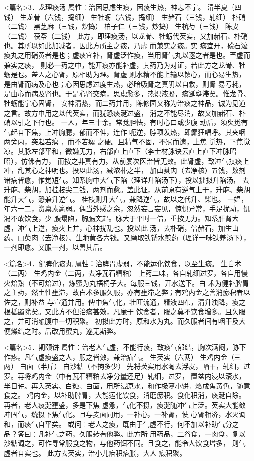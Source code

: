 \documentclass[a4paper,12pt,UTF8,twoside]{ctexbook}
\begin{document}
<篇名>3．龙理痰汤
属性：治因思虑生痰，因痰生热，神志不宁。 
清半夏（四钱） 生龙骨（六钱，捣细） 生牡蛎（六钱，捣细） 生赭石（三钱，轧细） 朴硝（二钱） 
黑芝麻（三钱，炒捣） 柏子仁（三钱，炒捣） 生杭芍（三钱） 陈皮（二钱） 茯苓（二钱） 
此方，即理痰汤，以龙骨、牡蛎代芡实，又加赭石、朴硝也。其所以如此加减者，因此方所主之痰，乃虚 
而兼实之痰。实 
痰宜开，礞石滚痰丸之用硝黄者是也；虚痰宜补，肾虚泛作痰，当用肾气丸以逐之者是也。至虚而兼实之痰， 
则必一药之中，能开痰亦能补虚，其药乃为对证，若此方之龙骨、牡蛎是也。盖人之心肾，原相助为理。肾虚 
则水精不能上输以镇心，而心易生热，是由肾而病及心也；心因思虑过度生热，必暗吸肾之真阴以自救，则肾 
易亏耗，是由心而病及肾也。于是心肾交病，思虑愈多，热炽液凝，痰涎壅滞矣。惟龙骨、牡蛎能宁心固肾， 
安神清热，而二药并用，陈修园又称为治痰之神品，诚为见道之言。故方中用之以代芡实，而犹恐痰涎过盛， 
消之不能尽消，故又加赭石、朴硝以引之下行也。 
一人，年三十余。常觉胆怯，有时心口或少腹 动后，须臾觉有气起自下焦，上冲胸臆，郁而不伸，连作 
呃逆，脖项发热，即癫狂唱呼。其夹咽两旁内，突起若瘰 ，而不若瘰 之硬。且精气不固，不寐而遗，上焦 
觉热，下焦觉凉。其脉左部平和，微嫌无力，右部直上直下（李士材脉诀云直上直下冲脉昭昭），仿佛有力， 
而按之非真有力。从前屡次医治皆无效。此肾虚，致冲气挟痰上冲，乱其心之神明也。投以此汤，减浓朴之半， 
加山萸肉（去净核）五钱，数剂诸病皆愈，惟觉短气。知系胸中大气下陷（理详升陷汤下），投以拙拟升陷汤， 
去升麻、柴胡，加桂枝尖二钱，两剂而愈。盖此证，从前原有逆气上干，升麻、柴胡能升大气，恐兼升逆气。 
桂枝则升大气，兼降逆气，故以之代升、柴也。 
一媪，年六十二，资禀素羸弱。偶当外感之余，忽然妄言妄见，惊惧异常，手足扰动，饥渴不敢饮食，少 
腹塌陷，胸膈突起。脉大于平时一倍，重按无力。知系肝肾大虚，冲气上逆，痰火上并，心神扰乱也。投以此 
汤，去朴硝，倍赭石，加生山药、山萸肉（去净核）、生地黄各六钱。又磨取铁锈水煎药（理详一味铁养汤下）， 
一剂即愈。又服一剂，以善其后。 


<篇名>4．健脾化痰丸
属性：治脾胃虚弱，不能运化饮食，以至生痰。 
生白术（二两） 生鸡内金（二两，去净瓦石糟粕） 
上药二味，各自轧细过罗，各自用慢火焙熟（不可焙过），炼蜜为丸梧桐子大。每服三钱，开水送下。白 
术为健补脾胃之主药，然土性壅滞，故白术多服久服，亦有壅滞之弊；有鸡内金之善消瘀积者以佐之，则补益 
与宣通并用。俾中焦气化，壮旺流通，精液四布，清升浊降，痰之根柢蠲除矣。又此方不但治痰甚效，凡廉于 
饮食者，服之莫不饮食增多。且久服之，并可消融腹中一切积聚。 
初拟此方时，原和水为丸。而久服者间有咽干及大便燥结之时。后改用蜜丸，遂无斯弊。 


<篇名>5．期颐饼
属性：治老人气虚，不能行痰，致痰气郁结，胸次满闷，胁下作疼。凡气虚痰盛之人，服之皆效，兼治疝气。 
生芡实（六两） 生鸡内金（三两） 白面（半斤） 白沙糖（不拘多少） 
先将芡实用水淘去浮皮，晒干，轧细，过罗。再将鸡内金（中有瓦石糟粕去净分量还足）轧细，过罗， 
置盆内浸以滚水，半日许。再入芡实、白糖、白面，用所浸原水，和作极薄小饼，烙成焦黄色，随意食之。 
鸡内金，以补助脾胃，大能运化饮食，消磨瘀积。食化积消，痰涎自除。再者，老人痰涎壅盛，多是下焦 
虚惫，气化不摄，痰涎随冲气上泛。芡实大能敛冲固气，统摄下焦气化。且与麦面同用，一补心，一补肾，使 
心肾相济，水火调和，而痰气自平矣。 
或问∶老人之痰，既由于气虚不行，何不加以补助气分之品？答曰∶凡补气之药，久服转有他弊。此方所 
用药品，二谷食，一肉食，复以沙糖调之，可作寻常服食之物，与他药饵不同。且食之，能令人饮食增多， 
则气虚者自实也。 
此方去芡实，治小儿疳积痞胀，大人 瘕积聚。 
\end{document}
